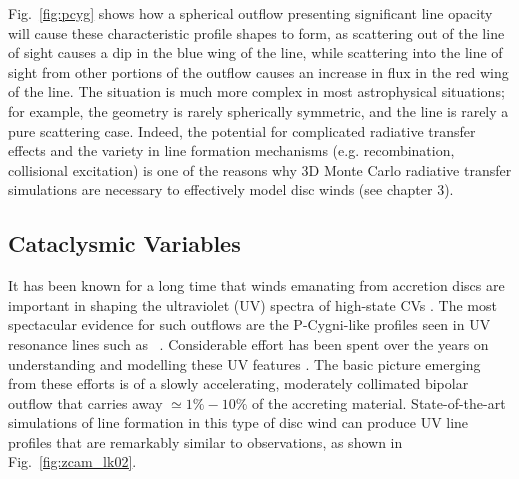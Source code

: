 Fig.~\ref{fig:pcyg} shows how a spherical outflow presenting
significant line opacity will 
cause these characteristic profile shapes to form, 
as scattering out of the line of sight 
causes a dip in the blue wing of the line, while scattering into the 
line of sight from other portions of the outflow causes an increase in flux
in the red wing of the line. The situation is much more complex in most
astrophysical situations; for example, the geometry is rarely spherically 
symmetric, and the line is rarely a pure scattering case. 
Indeed, the potential 
for complicated radiative transfer effects and 
the variety in line formation mechanisms 
(e.g. recombination, collisional excitation)
is one of the reasons why 3D Monte Carlo radiative 
transfer simulations are necessary
to effectively model disc winds (see chapter 3).


\subsection{Cataclysmic Variables}
\label{sec:cv_winds}
It has been known for a long time that winds emanating from
accretion discs are important in shaping the ultraviolet (UV) spectra
of high-state CVs \citep{heap1978, greensteinoke1982}. 
The most spectacular evidence for such
outflows are the P-Cygni-like profiles seen in UV resonance lines such as
\civfull\ \citep[e.g. ][see Fig.~\ref{fig:cordova}]{cordova1982}. 
Considerable effort has been spent over the
years on understanding and modelling these UV features 
\citep[e.g.][]{drewverbunt1985,maucheraymond1987,SV93,KWD95,
kd1997,knigge1997,LK02,noebauer,puebla2011}. 
The basic picture emerging from these efforts is
of a slowly accelerating, moderately collimated bipolar
outflow that carries away $\simeq 1\% - 10\%$ of the accreting
material. State-of-the-art simulations of line formation in this type
of disc wind can produce UV line profiles that are remarkably similar
to observations, as shown in Fig.~\ref{fig:zcam_lk02}.

